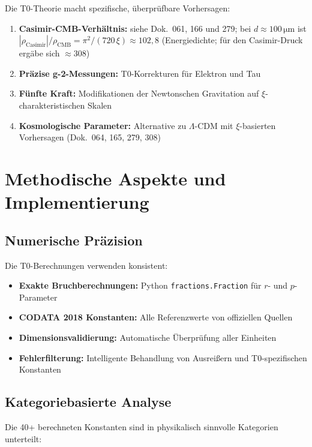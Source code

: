 	Die T0-Theorie macht spezifische, überprüfbare Vorhersagen:
	
	\begin{enumerate}
		\item \textbf{Casimir-CMB-Verhältnis:} siehe Dok.~061, 166 und 279; bei $d \approx 100\,\si{\micro\meter}$ ist $|\rho_{\text{Casimir}}|/\rho_{\text{CMB}} = \pi^2/(720\,\xi) \approx 102{,}8$ (Energiedichte; für den Casimir-Druck ergäbe sich $\approx 308$)
		\item \textbf{Präzise g-2-Messungen:} T0-Korrekturen für Elektron und Tau
		\item \textbf{Fünfte Kraft:} Modifikationen der Newtonschen Gravitation auf $\xi$-charakteristischen Skalen
		\item \textbf{Kosmologische Parameter:} Alternative zu $\Lambda$-CDM mit $\xi$-basierten Vorhersagen (Dok.~064, 165, 279, 308)
	\end{enumerate}
	
	\section{Methodische Aspekte und Implementierung}
	
	\subsection{Numerische Präzision}
	
	Die T0-Berechnungen verwenden konsistent:
	
	\begin{itemize}
		\item \textbf{Exakte Bruchberechnungen:} Python \texttt{fractions.Fraction} für $r$- und $p$-Parameter
		\item \textbf{CODATA 2018 Konstanten:} Alle Referenzwerte von offiziellen Quellen
		\item \textbf{Dimensionsvalidierung:} Automatische Überprüfung aller Einheiten
		\item \textbf{Fehlerfilterung:} Intelligente Behandlung von Ausreißern und T0-spezifischen Konstanten
	\end{itemize}
	
	\subsection{Kategoriebasierte Analyse}
	
	Die 40+ berechneten Konstanten sind in physikalisch sinnvolle Kategorien unterteilt:
	
